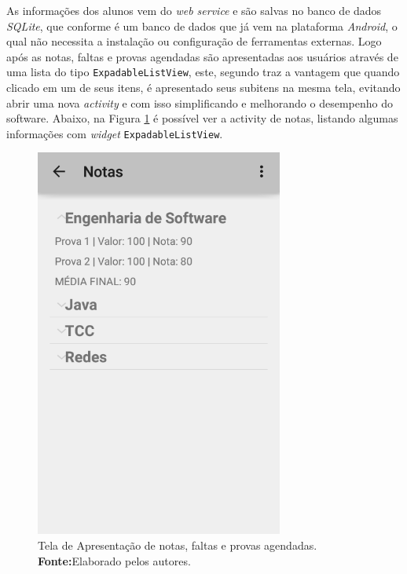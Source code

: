 	\par As informações dos alunos vem do \textit{web service} e são salvas no
banco de dados \textit{SQLite}, que conforme  é um
banco de dados que já vem na plataforma \textit{Android}, o qual não necessita
a instalação ou configuração de ferramentas externas. Logo após as notas, faltas
e provas agendadas são apresentadas aos usuários através de uma lista do tipo
\texttt{ExpadableListView}, este, segundo  traz a vantagem
que quando clicado em um de seus itens, é apresentado seus subitens na mesma
tela, evitando abrir uma nova \textit{activity} e com isso simplificando e
melhorando o desempenho do software. Abaixo, na Figura \ref{fig:dr4} é possível
ver a activity de notas, listando algumas informações com \textit{widget}
\texttt{ExpadableListView}.

\begin{figure}[h!]
	\centerline{\includegraphics[scale=0.5]{./imagens/3_discussao_resultados/dr4.png}}
	\caption[Tela de Apresentação de notas, faltas e provas agendadas]{Tela de
	Apresentação de notas, faltas e provas agendadas.
		\textbf{Fonte:}Elaborado pelos autores.}
	\label{fig:dr4}
\end{figure}


